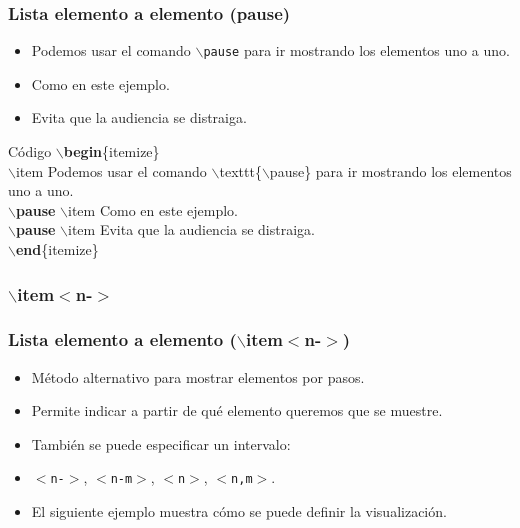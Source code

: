\documentclass[aspectratio=1610]{beamer}%
\begin{document}
\begin{frame}[fragile]
\frametitle{\textbf{Lista elemento a elemento (pause)}}
\justifying
 \begin{itemize}\justifying
  \item Podemos usar el comando \texttt{$\backslash$pause} para ir mostrando los elementos uno a uno.
  \pause \item Como en este ejemplo.
  \pause \item Evita que la audiencia se distraiga.
\end{itemize}

\begin{exampleblock}{Código}
 $\backslash$\textbf{begin}\{itemize\}\\
  $\backslash$item Podemos usar el comando $\backslash$texttt\{$\backslash$pause\} para ir mostrando los elementos uno a uno.\\
  $\backslash$\textbf{pause} $\backslash$item Como en este ejemplo.\\
  $\backslash$\textbf{pause} $\backslash$item Evita que la audiencia se distraiga.\\
$\backslash$\textbf{end}\{itemize\}
\end{exampleblock}

\end{frame}

\subsubsection{$\backslash$item$<$n-$>$}
\begin{frame}[fragile]
\frametitle{\textbf{Lista elemento a elemento ($\backslash$item$<$n-$>$)}}
\justifying
 \begin{itemize}\justifying
  \item Método alternativo para mostrar elementos por pasos.
  \item Permite indicar a partir de qué elemento queremos que se muestre.
  \item También se puede especificar un intervalo:
  \item [] \texttt{$<$n-$>$}, \texttt{$<$n-m$>$}, \texttt{$<$n$>$}, \texttt{$<$n,m$>$}.
  \item El siguiente ejemplo muestra cómo se puede definir la visualización.
\end{itemize}

\end{frame}
\end{document}
